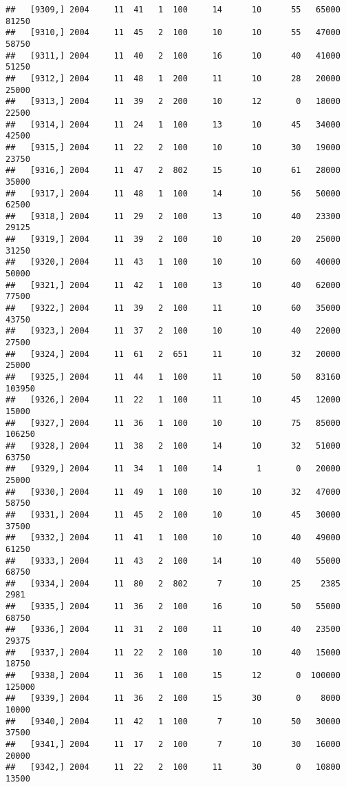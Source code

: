 \documentclass{article}\usepackage[]{graphicx}\usepackage[]{color}
\makeatletter
\newenvironment{kframe}{%
 \def\at@end@of@kframe{}%
 \ifinner\ifhmode%
  \def\at@end@of@kframe{\end{minipage}}%
  \begin{minipage}{\columnwidth}%
 \fi\fi%
 \def\FrameCommand##1{\hskip\@totalleftmargin \hskip-\fboxsep
 \colorbox{shadecolor}{##1}\hskip-\fboxsep
     \hskip-\linewidth \hskip-\@totalleftmargin \hskip\columnwidth}%
 \MakeFramed {\advance\hsize-\width
   \@totalleftmargin\z@ \linewidth\hsize
   \@setminipage}}%
 {\par\unskip\endMakeFramed%
 \at@end@of@kframe}
\newenvironment{knitrout}{}{} %
\makeatother
\begin{document}
\begin{knitrout}
\begin{kframe}
\begin{verbatim}
##   [9309,] 2004     11  41   1  100     14      10      55   65000   81250
##   [9310,] 2004     11  45   2  100     10      10      55   47000   58750
##   [9311,] 2004     11  40   2  100     16      10      40   41000   51250
##   [9312,] 2004     11  48   1  200     11      10      28   20000   25000
##   [9313,] 2004     11  39   2  200     10      12       0   18000   22500
##   [9314,] 2004     11  24   1  100     13      10      45   34000   42500
##   [9315,] 2004     11  22   2  100     10      10      30   19000   23750
##   [9316,] 2004     11  47   2  802     15      10      61   28000   35000
##   [9317,] 2004     11  48   1  100     14      10      56   50000   62500
##   [9318,] 2004     11  29   2  100     13      10      40   23300   29125
##   [9319,] 2004     11  39   2  100     10      10      20   25000   31250
##   [9320,] 2004     11  43   1  100     10      10      60   40000   50000
##   [9321,] 2004     11  42   1  100     13      10      40   62000   77500
##   [9322,] 2004     11  39   2  100     11      10      60   35000   43750
##   [9323,] 2004     11  37   2  100     10      10      40   22000   27500
##   [9324,] 2004     11  61   2  651     11      10      32   20000   25000
##   [9325,] 2004     11  44   1  100     11      10      50   83160  103950
##   [9326,] 2004     11  22   1  100     11      10      45   12000   15000
##   [9327,] 2004     11  36   1  100     10      10      75   85000  106250
##   [9328,] 2004     11  38   2  100     14      10      32   51000   63750
##   [9329,] 2004     11  34   1  100     14       1       0   20000   25000
##   [9330,] 2004     11  49   1  100     10      10      32   47000   58750
##   [9331,] 2004     11  45   2  100     10      10      45   30000   37500
##   [9332,] 2004     11  41   1  100     10      10      40   49000   61250
##   [9333,] 2004     11  43   2  100     14      10      40   55000   68750
##   [9334,] 2004     11  80   2  802      7      10      25    2385    2981
##   [9335,] 2004     11  36   2  100     16      10      50   55000   68750
##   [9336,] 2004     11  31   2  100     11      10      40   23500   29375
##   [9337,] 2004     11  22   2  100     10      10      40   15000   18750
##   [9338,] 2004     11  36   1  100     15      12       0  100000  125000
##   [9339,] 2004     11  36   2  100     15      30       0    8000   10000
##   [9340,] 2004     11  42   1  100      7      10      50   30000   37500
##   [9341,] 2004     11  17   2  100      7      10      30   16000   20000
##   [9342,] 2004     11  22   2  100     11      30       0   10800   13500

\end{verbatim}
\end{kframe}
\end{knitrout}
\end{document}
